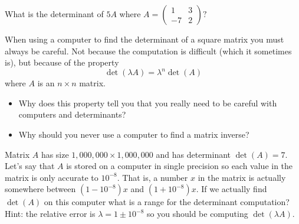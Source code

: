 \begin{problem}
    What is the determinant of $5A$ where $A = \begin{pmatrix} 1 & 3 \\ -7 & 2 \end{pmatrix}?$
\end{problem}

\begin{problem}
    When using a computer to find the determinant of a square matrix you must always be careful.  Not because the
    computation is difficult (which it sometimes is), but because of the property
    \[ \det(\lambda A) = \lambda^n \det(A) \]
    where $A$ is an $n \times n$ matrix.

    \begin{itemize}
        \item Why does this property tell you that you really need to be careful with computers and
            determinants?  
        \item Why should you never use a computer to find a matrix inverse?
    \end{itemize}
\end{problem}


\begin{problem}
    Matrix $A$ has size $1,000,000 \times 1,000,000$ and has determinant $\det(A) = 7$.  Let's say
    that $A$ is stored on a computer in single precision so each value in the matrix is
    only accurate to $10^{-8}$.  That is, a number $x$ in the matrix is actually somewhere
    between $(1-10^{-8})x$ and $(1+10^{-8})x$.  If we actually find $\det(A)$ on this
    computer what is a range for the determinant computation? \\
    Hint: the relative error is $\lambda = 1 \pm 10^{-8}$ so you should be computing
    $\det(\lambda A)$.
\end{problem}


